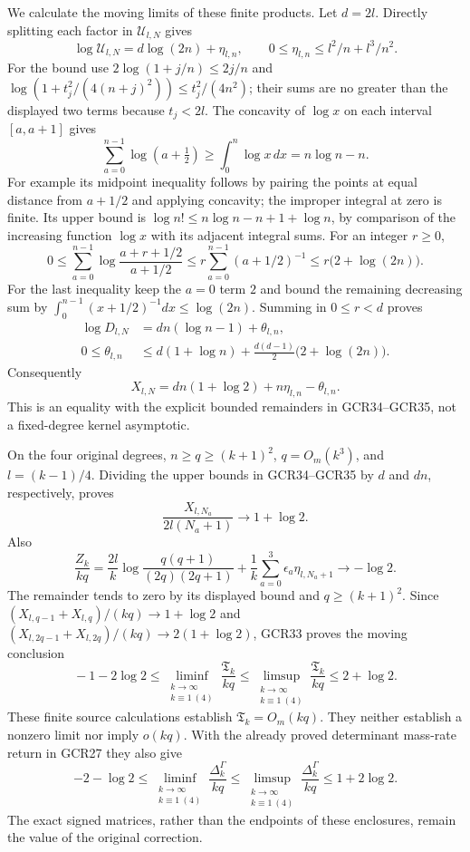 \documentclass[11pt,a4paper]{article}
\begin{document}
We calculate the moving limits of these finite products.
Let $d=2l$. Directly splitting each factor in $\mathscr U_{l,N}$
gives
\[
 \log\mathscr U_{l,N}=d\log(2n)+\eta_{l,n},\qquad
 0\leq\eta_{l,n}\leq l^2/n+l^3/n^2.
\tag{GCR34}
\]
For the bound use
$2\log(1+j/n)\leq2j/n$ and
$\log(1+t_j^2/(4(n+j)^2))\leq t_j^2/(4n^2)$;
their sums are no greater than the displayed two terms because
$t_j<2l$.
The concavity of $\log x$ on each interval $[a,a+1]$ gives
\[
 \sum_{a=0}^{n-1}\log(a+\tfrac12)
       \geq\int_0^n\log x\,dx=n\log n-n.
\]
For example its midpoint inequality follows by pairing the
points at equal distance from $a+1/2$ and applying concavity;
the improper integral at zero is finite. Its upper bound is
$\log n!\leq n\log n-n+1+\log n$, by comparison of the
increasing function $\log x$ with its adjacent integral sums.
For an integer $r\geq0$,
\[
 0\leq\sum_{a=0}^{n-1}
          \log\frac{a+r+1/2}{a+1/2}
   \leq r\sum_{a=0}^{n-1}(a+1/2)^{-1}
   \leq r\bigl(2+\log(2n)\bigr).
\]
For the last inequality keep the $a=0$ term $2$ and bound the
remaining decreasing sum by
$\int_0^{n-1}(x+1/2)^{-1}dx\leq\log(2n)$.
Summing in $0\leq r<d$ proves
\[
\begin{split}
 \log D_{l,N}&=dn(\log n-1)+\theta_{l,n},\\
 0\leq\theta_{l,n}
 &\leq d(1+\log n)
       +\tfrac{d(d-1)}2\bigl(2+\log(2n)\bigr).
\end{split}\tag{GCR35}
\]
Consequently
\[
 X_{l,N}=dn(1+\log2)+n\eta_{l,n}-\theta_{l,n}.
\tag{GCR36}
\]
This is an equality with the explicit bounded remainders in
GCR34--GCR35, not a fixed-degree kernel asymptotic.

On the four original degrees, $n\geq q\geq(k+1)^2$,
$q=O_m(k^3)$, and $l=(k-1)/4$. Dividing the upper bounds
in GCR34--GCR35 by $d$ and $dn$, respectively, proves
\[
 \frac{X_{l,N_a}}{2l(N_a+1)}\longrightarrow1+\log2.
\tag{GCR37}
\]
Also
\[
 \frac{Z_k}{kq}
 =\frac{2l}{k}\log
       \frac{q(q+1)}{(2q)(2q+1)}
      +\frac1k\sum_{a=0}^3\epsilon_a\eta_{l,N_a+1}
       \longrightarrow-\log2.
\tag{GCR38}
\]
The remainder tends to zero by its displayed bound and
$q\geq(k+1)^2$. Since
$(X_{l,q-1}+X_{l,q})/(kq)\to1+\log2$ and
$(X_{l,2q-1}+X_{l,2q})/(kq)\to2(1+\log2)$,
GCR33 proves the moving conclusion
\[
 \boxed{\quad
 -1-2\log2
 \leq\liminf_{\substack{k\to\infty\\k\equiv1\ (4)}}
              \frac{\mathfrak T_k}{kq}
 \leq\limsup_{\substack{k\to\infty\\k\equiv1\ (4)}}
              \frac{\mathfrak T_k}{kq}
 \leq2+\log2.
 \quad}\tag{GCR39}
\]
These finite source calculations establish
$\mathfrak T_k=O_m(kq)$. They neither establish a nonzero
limit nor imply $o(kq)$. With the already proved determinant
mass-rate return in GCR27 they also give
\[
 -2-\log2
 \leq\liminf_{\substack{k\to\infty\\k\equiv1\ (4)}}
            \frac{\Delta_k^\Gamma}{kq}
 \leq\limsup_{\substack{k\to\infty\\k\equiv1\ (4)}}
            \frac{\Delta_k^\Gamma}{kq}
 \leq1+2\log2.
\tag{GCR40}
\]
The exact signed matrices, rather than the endpoints of these
enclosures, remain the value of the original correction.
\end{document}
